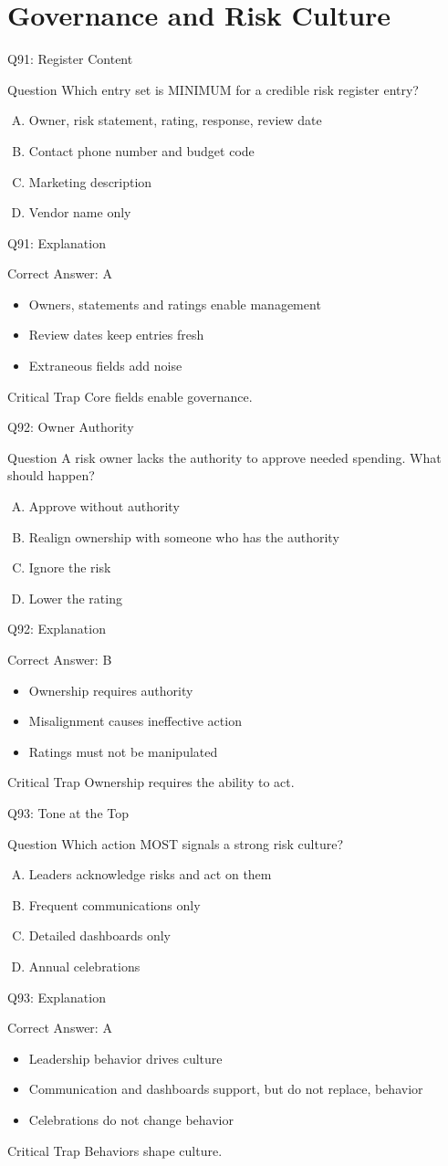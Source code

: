 \documentclass[aspectratio=169]{beamer}
\newcommand{\hq}[7]{%
	\begin{frame}{Q#1: #2}
		\begin{block}{Question}
			#3
		\end{block}
		\begin{enumerate}[(A)]
			#4
		\end{enumerate}
	\end{frame}
	\begin{frame}{Q#1: Explanation}
		\begin{block}{Correct Answer: #5}
			\begin{itemize}
				#6
			\end{itemize}
		\end{block}
		\begin{alertblock}{Critical Trap}
			#7
		\end{alertblock}
	\end{frame}
}
\begin{document}
	\section{Governance and Risk Culture}
	
	\hq{91}{Register Content}
	{Which entry set is MINIMUM for a credible risk register entry?}
	{\item Owner, risk statement, rating, response, review date
		\item Contact phone number and budget code
		\item Marketing description
		\item Vendor name only}
	{A}
	{\item Owners, statements and ratings enable management
		\item Review dates keep entries fresh
		\item Extraneous fields add noise}
	{Core fields enable governance.}
	
	\hq{92}{Owner Authority}
	{A risk owner lacks the authority to approve needed spending. What should happen?}
	{\item Approve without authority
		\item Realign ownership with someone who has the authority
		\item Ignore the risk
		\item Lower the rating}
	{B}
	{\item Ownership requires authority
		\item Misalignment causes ineffective action
		\item Ratings must not be manipulated}
	{Ownership requires the ability to act.}
	
	\hq{93}{Tone at the Top}
	{Which action MOST signals a strong risk culture?}
	{\item Leaders acknowledge risks and act on them
		\item Frequent communications only
		\item Detailed dashboards only
		\item Annual celebrations}
	{A}
	{\item Leadership behavior drives culture
		\item Communication and dashboards support, but do not replace, behavior
		\item Celebrations do not change behavior}
	{Behaviors shape culture.}
	
\end{document}
